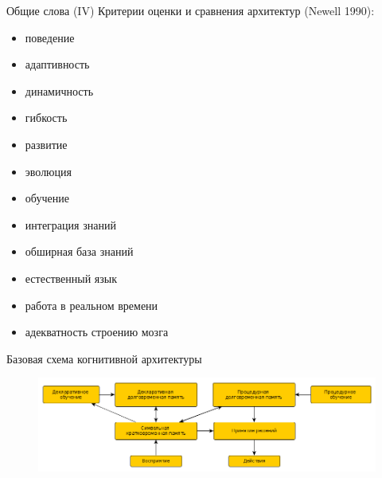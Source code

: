 \documentclass{beamer}
\begin{document}
\begin{frame}{Общие слова (IV)}
Критерии оценки и сравнения архитектур (Newell 1990):\\
\medskip
\begin{itemize}
	\item поведение
	\item адаптивность
	\item динамичность
	\item гибкость
	\item развитие
	\item эволюция
	\item обучение
	\item интеграция знаний
	\item обширная база знаний
	\item естественный язык
	\item работа в реальном времени
	\item адекватность строению мозга
\end{itemize}
\end{frame}

\fi


\begin{frame}{Базовая схема когнитивной архитектуры}
\begin{center}
	\begin{figure}[H]
		\includegraphics[scale=0.335]{prototypical_ca.png} 
	\end{figure}
\end{center}
\end{frame}
\end{document}
